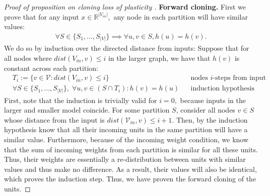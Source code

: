 \documentclass[11pt]{article}
\newcommand{\R}{\mathbb{R}}
\begin{document}
\begin{proof}[Proof of proposition on cloning loss of plasticity ]

    \textbf{Forward cloning.} First we prove that for any input $x \in \R^{|V_{in}|},$ any node in each partition will have similar values:
    \begin{align*}
        \forall S \in \{S_1,\dots,S_{|V|}\} \implies \forall u,v \in S, h(u) = h(v). 
    \end{align*}
    We do so by induction over the directed distance from inputs:
    Suppose that for all nodes where $dist(V_{in},v) \le i$ in the larger graph, we have that $h(v)$ is constant across each partition: 
    \begin{align*}
        &T_i:= \{v\in \mathcal{V}: dist(V_{in},v) \le i\} && \text{nodes $i$-steps from input}\\
        &\forall S \in \{S_1,\dots,S_{|V|}\}, \; \forall u,v \in (S\cap T_i): h(v) = h(u)  && \text{induction hypothesis}
    \end{align*}
    First, note that the induction is trivially valid for $i=0,$ because inputs in the larger and smaller model coincide. 
    For some partition $S$, consider all nodes $v \in S$ whose distance from the input is $dist(\mathcal{V}_{in},v) \le i+1.$ Then, by the induction hypothesis know that all their incoming units in the same partition will have a similar value. Furthermore, because of the incoming weight condition, we know that the sum of incoming weights from each partition is similar for all these units. Thus, their weights are essentially a re-distribution between units with similar values and thus make no difference. As a result, their values will also be identical, which proves the induction step. Thus, we have proven the forward cloning of the units. 
    

\end{proof}
\end{document}
